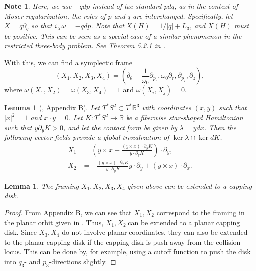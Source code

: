 \documentclass{amsart}
\newcommand{\R}{\mathbb{R}}
\renewcommand{\o}{\omega}
\newcommand{\ld}{\lambda}
\newcommand{\pp}{\partial}
\newtheorem{lmm}[thm]{Lemma}
\newtheorem{note}[thm]{Note}
\begin{document}
\begin{note}\rm
	Here, we use $-qdp$ instead of the standard $pdq$, as in the context of Moser regularization, the roles of $p$ and $q$ are interchanged.
	Specifically, let $X=q\pp_q$ so that $i_X \o = -qdp$.
	Note that $X(H) = 1/|q|+L_3$, and $X(H)$ must be positive.
	This can be seen as a special case of a similar phenomenon in the restricted three-body problem.
	See Theorem 5.2.1 in \cite{Cho_Jung_Kim_20}.
\end{note}

With this, we can find a symplectic frame
$$
(X_1, X_2, X_3, X_4)= \left( \pp_\theta + \frac{1}{\o_0}\pp_{p_r}, \o_0 \pp_r, \pp_{p_z},\pp_z\right),
$$
where $\o(X_1,X_2)=\o(X_3,X_4)=1$ and $\o(X_i,X_j)=0$.

\begin{lmm}[\cite{Albers_Fish_Frauenfelder_vanKoert_13}, Appendix B]\label{Lem - Framing in S2}
	Let $T^*S^2\subset T^*\R^3$ with coordinates $(x,y)$ such that $|x|^2=1$ and $ x \cdot y=0$.
	Let $K:T^*S^2\to\R$ be a fiberwise star-shaped Hamiltonian such that $y\pp_y K>0$, and let the contact form be given by $\ld = ydx$.
	Then the following vector fields provide a global trivialization of $\ker \ld \cap \ker dK$.
	$$
	\begin{aligned}
		X_1 &= \left( y\times x - \frac{ (y\times x)\cdot \pp_y K}{y\cdot \pp_y K}\right)\cdot \pp_y,\\
		X_2 &=-\frac{(y\times x)\cdot \pp_x K}{y\cdot  \pp_y K}y\cdot \pp_y + (y\times x)\cdot \pp_x.
	\end{aligned}
	$$
\end{lmm}

\begin{lmm}\label{Lem - Extending planar frame}
	The framing $X_1,X_2,X_3,X_4$ given above can be extended to a capping disk.
\end{lmm}
\begin{proof}
	From \cite{Albers_Fish_Frauenfelder_vanKoert_13} Appendix B, we can see that $X_1,X_2$ correspond to the framing in the planar orbit given in .
	Thus, $X_1,X_2$ can be extended to a planar capping disk.
	Since $X_3,X_4$ do not involve planar coordinates, they can also be extended to the planar capping disk if the capping disk is push away from the collision locus.
	This can be done by, for example, using a cutoff function to push the disk into $q_3$- and $p_3$-directions slightly.
\end{proof}
\end{document}
